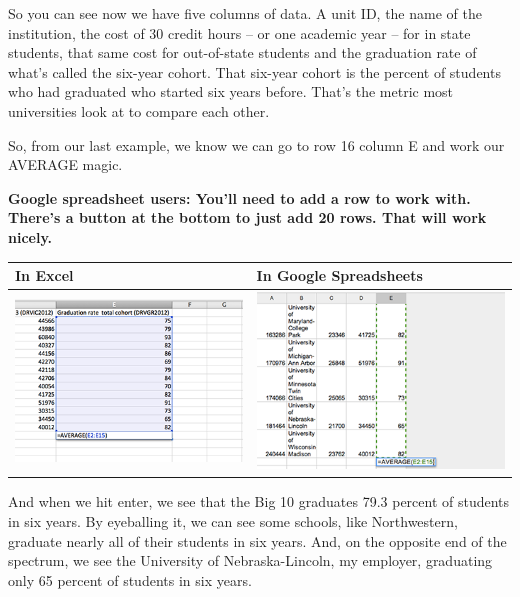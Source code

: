 \documentclass[
]{book}
\begin{document}
So you can see now we have five columns of data. A unit ID, the name of the institution, the cost of 30 credit hours -- or one academic year -- for in state students, that same cost for out-of-state students and the graduation rate of what's called the six-year cohort. That six-year cohort is the percent of students who had graduated who started six years before. That's the metric most universities look at to compare each other.

So, from our last example, we know we can go to row 16 column E and work our AVERAGE magic.

\textbf{Google spreadsheet users: You'll need to add a row to work with. There's a button at the bottom to just add 20 rows. That will work nicely.}

\begin{longtable}[]{@{}ll@{}}
\toprule
In Excel & In Google Spreadsheets \\
\midrule
\endhead
\includegraphics{images/excelmean5.png} & \includegraphics{images/googlemean5.png} \\
\bottomrule
\end{longtable}

And when we hit enter, we see that the Big 10 graduates 79.3 percent of students in six years. By eyeballing it, we can see some schools, like Northwestern, graduate nearly all of their students in six years. And, on the opposite end of the spectrum, we see the University of Nebraska-Lincoln, my employer, graduating only 65 percent of students in six years.
\end{document}
